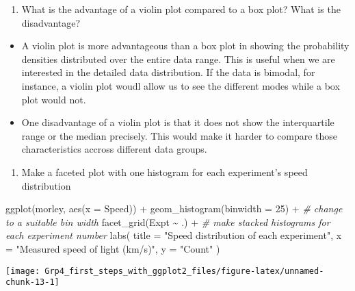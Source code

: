 \documentclass[
]{article}
\newenvironment{Shaded}{\begin{snugshade}}{\end{snugshade}}
\newcommand{\AttributeTok}[1]{\textcolor[rgb]{0.77,0.63,0.00}{#1}}
\newcommand{\CommentTok}[1]{\textcolor[rgb]{0.56,0.35,0.01}{\textit{#1}}}
\newcommand{\DecValTok}[1]{\textcolor[rgb]{0.00,0.00,0.81}{#1}}
\newcommand{\FunctionTok}[1]{\textcolor[rgb]{0.00,0.00,0.00}{#1}}
\newcommand{\NormalTok}[1]{#1}
\newcommand{\SpecialCharTok}[1]{\textcolor[rgb]{0.00,0.00,0.00}{#1}}
\newcommand{\StringTok}[1]{\textcolor[rgb]{0.31,0.60,0.02}{#1}}
\providecommand{\tightlist}{%
  \setlength{\itemsep}{0pt}\setlength{\parskip}{0pt}}
\begin{document}
\begin{enumerate}
\def\labelenumi{(\alph{enumi})}
\setcounter{enumi}{6}
\tightlist
\item
  What is the advantage of a violin plot compared to a box plot? What is
  the disadvantage?
\end{enumerate}

\begin{itemize}
\item
  A violin plot is more advantageous than a box plot in showing the
  probability densities distributed over the entire data range. This is
  useful when we are interested in the detailed data distribution. If
  the data is bimodal, for instance, a violin plot woudl allow us to see
  the different modes while a box plot would not.
\item
  One disadvantage of a violin plot is that it does not show the
  interquartile range or the median precisely. This would make it harder
  to compare those characteristics accross different data groups.
\end{itemize}

\begin{enumerate}
\def\labelenumi{(\alph{enumi})}
\setcounter{enumi}{7}
\tightlist
\item
  Make a faceted plot with one histogram for each experiment's speed
  distribution
\end{enumerate}

\begin{Shaded}
\begin{Highlighting}[]
  \FunctionTok{ggplot}\NormalTok{(morley, }\FunctionTok{aes}\NormalTok{(}\AttributeTok{x =}\NormalTok{ Speed)) }\SpecialCharTok{+}
  \FunctionTok{geom\_histogram}\NormalTok{(}\AttributeTok{binwidth =} \DecValTok{25}\NormalTok{) }\SpecialCharTok{+} \CommentTok{\# change to a suitable bin width}
  \FunctionTok{facet\_grid}\NormalTok{(Expt }\SpecialCharTok{\textasciitilde{}}\NormalTok{ .) }\SpecialCharTok{+} \CommentTok{\# make stacked histograms for each experiment number}
  \FunctionTok{labs}\NormalTok{(}
    \AttributeTok{title =} \StringTok{"Speed distribution of each experiment"}\NormalTok{,}
    \AttributeTok{x =} \StringTok{"Measured speed of light (km/s)"}\NormalTok{,}
    \AttributeTok{y =} \StringTok{"Count"}
\NormalTok{  )}
\end{Highlighting}
\end{Shaded}

\begin{center}\texttt{[image: Grp4\_first\_steps\_with\_ggplot2\_files/figure-latex/unnamed-chunk-13-1]} \end{center}
\end{document}

